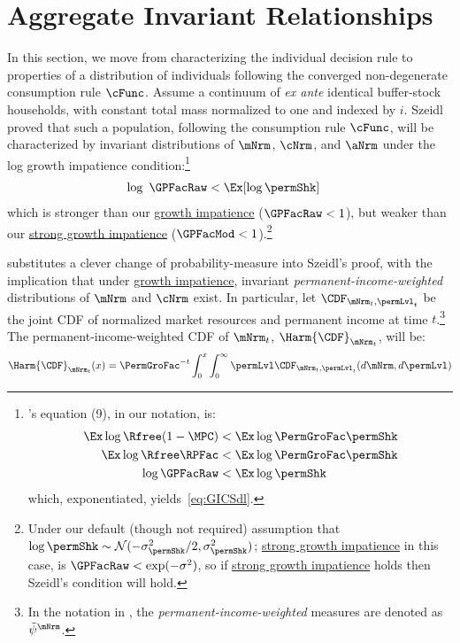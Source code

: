 \documentclass[BufferStockTheory]{subfiles}
\begin{document}
\section{Aggregate Invariant Relationships}
In this section, we move from characterizing the individual decision rule to properties of a distribution of individuals following the converged non-degenerate consumption rule $\cFunc$.
Assume a continuum of \textit{ex ante} identical buffer-stock households, with constant total mass normalized to one and indexed by $i$.
Szeidl~\citeyearpar{szeidlInvariant} proved that such a population, following the consumption rule $\cFunc$, will be characterized by invariant distributions of $\mNrm$, $\cNrm$, and $\aNrm$ under the log growth impatience condition:\footnote{\cite{szeidlInvariant}'s equation (9), in our notation, is:
  \begin{align*}
    \Ex \log \Rfree (1-\MPC) & < \Ex \log \PermGroFac \permShk
    \\  \Ex \log \Rfree \RPFac  &  < \Ex \log \PermGroFac \permShk
    \\ \log \GPFacRaw & < \Ex \log \permShk
  \end{align*}
  which, exponentiated, yields~\eqref{eq:GICSdl}.}
\hypertarget{GICSdl}{}
\begin{align}
   \log~\GPFacRaw & < \Ex [\log \permShk] \label{eq:GICSdl}
\end{align}
which is stronger than our \hyperlink{GICRaw}{growth impatience} ($\GPFacRaw < 1$), but weaker than our \hyperlink{GICMod}{strong growth impatience}  ($\GPFacMod < 1$).\footnote{Under our default (though not required) assumption that $\log \permShk \sim \mathcal{N}(-\sigma^{2}_{\permShk}/2,\sigma^{2}_{\permShk})$; \hyperlink{GICMod}{strong growth impatience} in this case, is $\GPFacRaw < \exp(-\sigma^{2})$, so if \hyperlink{GICMod}{strong growth impatience} holds then Szeidl's condition will hold.}

\hypertarget{Growth-Rates-of-Aggregate-Income-and-Consumption}{}

\cite{harmenbergInvariant} substitutes a clever change of probability-measure into Szeidl's proof, with the implication that under \hyperlink{GIC}{growth impatience}, invariant \emph{permanent-income-weighted} distributions of $\mNrm$ and $\cNrm$ exist.
In particular, let $\CDF_{\mNrm_{t},\permLvl_{t}}$ be the joint CDF of normalized market resources and permanent income at time $t$.\footnote{In the notation in \cite{harmenbergInvariant}, the \emph{permanent-income-weighted} measures are denoted as $\tilde{\psi}^{\mNrm}$.} The permanent-income-weighted CDF of $\mNrm_{t}$, $\Harm{\CDF}_{\mNrm_{t}}$, will be:
%
\begin{equation}\label{eq:HarmCDF}
\Harm{\CDF}_{\mNrm_{t}}(x) = \PermGroFac^{-t}\int_{0}^{x}\int_{0}^{\infty} \permLvl\CDF_{\mNrm_{t},\permLvl_{t}}(d\mNrm,d\permLvl)
\end{equation}
\end{document}
